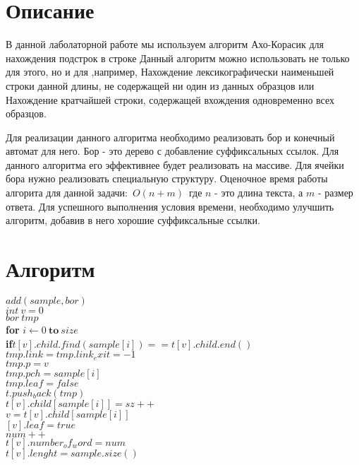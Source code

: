 \documentclass[pdf, unicode, 12pt, a4paper,oneside,fleqn]{article}
\begin{document}
    \section{Описание}
    В данной лаболаторной работе мы используем алгоритм Ахо-Корасик для нахождения подстрок в строке
    Данный алгоритм можно использовать не только для этого, но и для ,например, Нахождение
    лексикографически наименьшей строки данной длины, не содержащей ни один из данных образцов
    или Нахождение кратчайшей строки, содержащей вхождения одновременно всех образцов.

    Для реализации данного алгоритма необходимо реализовать бор и конечный автомат для него.
    Бор - это дерево с добавление суффиксальных ссылок. Для данного алгоритма его эффективнее будет
    реализовать на массиве. Для ячейки бора нужно реализовать специальную структуру. Оценочное время
    работы алгорита для данной задачи:\ $O(n + m)$\, где $n$ - это длина текста, а $m$ - размер
    ответа. Для успешного выполнения условия времени, необходимо улучшить алгоритм, добавив в него
    хорошие суффиксальные ссылки.\\

    \pagebreak
    \section{Алгоритм}

    $add(sample, bor)$\\
      $int\ v = 0$\\
      $bor\ tmp$\\
      \textbf{for} $i \leftarrow 0 \: \textbf{to} \: size$\\
      {\hspace*{0.5cm}\textbf{if}$ t[v].child.find(sample[i]) == t[v].child.end()$}\\
      {\hspace*{1cm}$tmp.link = tmp.link_exit = -1$}\\
      {\hspace*{1cm}$tmp.p = v$}\\
      {\hspace*{1cm}$tmp.pch = sample[i]$}\\
      {\hspace*{1cm}$tmp.leaf = false$}\\
      {\hspace*{1cm}$t.push_back(tmp)$}\\
      {\hspace*{1cm}$t[v].child[sample[i]] = sz++$}\\
      {\hspace*{0.5cm}$v = t[v].child[sample[i]]$}\\
      $[v].leaf = true$\\
      $num++$\\
      $t[v].number_of_word = num$\\
      $t[v].lenght = sample.size()$\\
\end{document}
